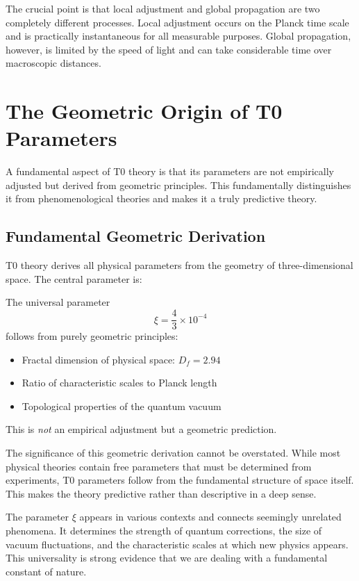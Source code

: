 \documentclass[12pt,a4paper]{article}
\begin{document}
	The crucial point is that local adjustment and global propagation are two completely different processes. Local adjustment occurs on the Planck time scale and is practically instantaneous for all measurable purposes. Global propagation, however, is limited by the speed of light and can take considerable time over macroscopic distances.
	
	\section{The Geometric Origin of T0 Parameters}
	
	A fundamental aspect of T0 theory is that its parameters are not empirically adjusted but derived from geometric principles. This fundamentally distinguishes it from phenomenological theories and makes it a truly predictive theory.
	
	\subsection{Fundamental Geometric Derivation}
	
	T0 theory derives all physical parameters from the geometry of three-dimensional space. The central parameter is:
	
	\begin{tcolorbox}[colback=t0blue!5!white, colframe=t0blue!75!black, title=T0 Prediction]
		The universal parameter
		\begin{equation}
			\xi = \frac{4}{3} \times 10^{-4}
		\end{equation}
		follows from purely geometric principles:
		\begin{itemize}
			\item Fractal dimension of physical space: $D_f = 2.94$
			\item Ratio of characteristic scales to Planck length
			\item Topological properties of the quantum vacuum
		\end{itemize}
		This is \emph{not} an empirical adjustment but a geometric prediction.
	\end{tcolorbox}
	
	The significance of this geometric derivation cannot be overstated. While most physical theories contain free parameters that must be determined from experiments, T0 parameters follow from the fundamental structure of space itself. This makes the theory predictive rather than descriptive in a deep sense.
	
	The parameter $\xi$ appears in various contexts and connects seemingly unrelated phenomena. It determines the strength of quantum corrections, the size of vacuum fluctuations, and the characteristic scales at which new physics appears. This universality is strong evidence that we are dealing with a fundamental constant of nature.
	
\end{document}
